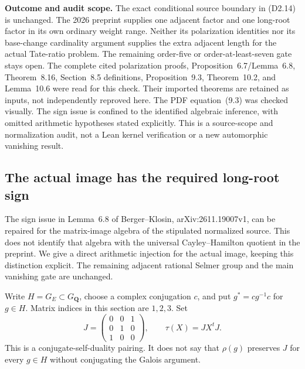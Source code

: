 \documentclass[11pt,a4paper]{article}
\theoremstyle{definition}
\renewcommand{\paragraph}[1]{\par\smallskip\noindent\textbf{#1}\quad\ignorespaces}
\begin{document}
\paragraph{Outcome and audit scope.}
The exact conditional source boundary in (D2.14) is unchanged.
The 2026 preprint supplies one adjacent factor and one long-root
factor in its own ordinary weight range.  Neither its polarization
identities nor its base-change cardinality argument supplies the
extra adjacent length for the actual Tate-ratio problem.  The
remaining order-five or order-at-least-seven gate stays open.
The complete cited polarization proofs, Proposition~6.7/Lemma~6.8,
Theorem~8.16, Section~8.5 definitions, Proposition~9.3,
Theorem~10.2, and Lemma~10.6 were read for this check.  Their imported
theorems are retained as inputs, not independently reproved here.
The PDF equation~(9.3) was checked visually.  The sign issue is
confined to the identified algebraic inference, with omitted
arithmetic hypotheses stated explicitly.  This is a source-scope
and normalization audit, not a Lean kernel verification or a new
automorphic vanishing result.



\subsection{The actual image has the required long-root sign}
\label{sec:kt-actual-image-polarization}

The sign issue in Lemma~6.8 of Berger--Klosin,
arXiv:2611.19007v1, can be repaired for the matrix-image algebra
of the stipulated normalized source.  This does not identify that
algebra with the universal Cayley--Hamilton quotient in the
preprint.  We give a direct arithmetic injection for the actual
image, keeping this distinction explicit.  The remaining adjacent
rational Selmer group and the main vanishing gate are unchanged.

Write $H=G_E\subset G_{\mathbf Q}$, choose a complex conjugation
$c$, and put $g^*=cg^{-1}c$ for $g\in H$.  Matrix indices in this
section are $1,2,3$.  Set
\[
 J=\begin{pmatrix}0&0&1\\0&1&0\\1&0&0\end{pmatrix},\qquad
 \tau(X)=JX^tJ.                                               \tag{AP.1}
\]
This is a conjugate-self-duality pairing.  It does not say that
$\rho(g)$ preserves $J$ for every $g\in H$ without conjugating
the Galois argument.
\end{document}
